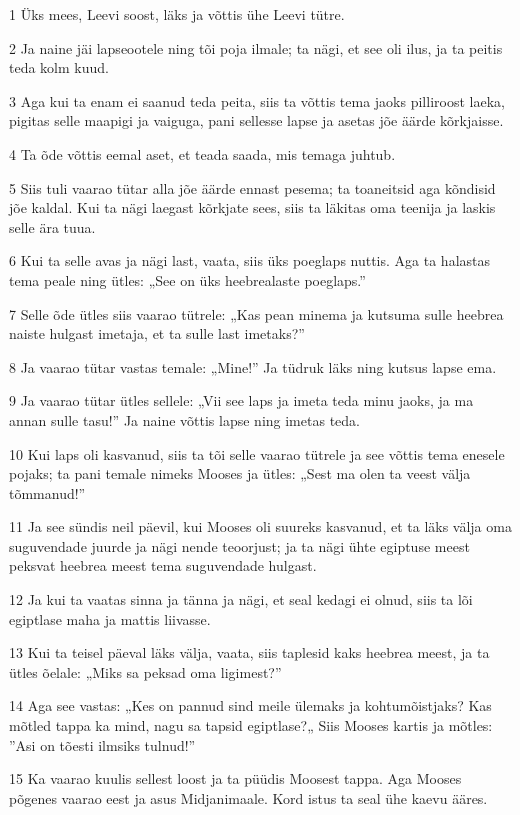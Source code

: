 \par 1 Üks mees, Leevi soost, läks ja võttis ühe Leevi tütre.
\par 2 Ja naine jäi lapseootele ning tõi poja ilmale; ta nägi, et see oli ilus, ja ta peitis teda kolm kuud.
\par 3 Aga kui ta enam ei saanud teda peita, siis ta võttis tema jaoks pilliroost laeka, pigitas selle maapigi ja vaiguga, pani sellesse lapse ja asetas jõe äärde kõrkjaisse.
\par 4 Ta õde võttis eemal aset, et teada saada, mis temaga juhtub.
\par 5 Siis tuli vaarao tütar alla jõe äärde ennast pesema; ta toaneitsid aga kõndisid jõe kaldal. Kui ta nägi laegast kõrkjate sees, siis ta läkitas oma teenija ja laskis selle ära tuua.
\par 6 Kui ta selle avas ja nägi last, vaata, siis üks poeglaps nuttis. Aga ta halastas tema peale ning ütles: „See on üks heebrealaste poeglaps.”
\par 7 Selle õde ütles siis vaarao tütrele: „Kas pean minema ja kutsuma sulle heebrea naiste hulgast imetaja, et ta sulle last imetaks?”
\par 8 Ja vaarao tütar vastas temale: „Mine!” Ja tüdruk läks ning kutsus lapse ema.
\par 9 Ja vaarao tütar ütles sellele: „Vii see laps ja imeta teda minu jaoks, ja ma annan sulle tasu!” Ja naine võttis lapse ning imetas teda.
\par 10 Kui laps oli kasvanud, siis ta tõi selle vaarao tütrele ja see võttis tema enesele pojaks; ta pani temale nimeks Mooses ja ütles: „Sest ma olen ta veest välja tõmmanud!”
\par 11 Ja see sündis neil päevil, kui Mooses oli suureks kasvanud, et ta läks välja oma suguvendade juurde ja nägi nende teoorjust; ja ta nägi ühte egiptuse meest peksvat heebrea meest tema suguvendade hulgast.
\par 12 Ja kui ta vaatas sinna ja tänna ja nägi, et seal kedagi ei olnud, siis ta lõi egiptlase maha ja mattis liivasse.
\par 13 Kui ta teisel päeval läks välja, vaata, siis taplesid kaks heebrea meest, ja ta ütles õelale: „Miks sa peksad oma ligimest?”
\par 14 Aga see vastas: „Kes on pannud sind meile ülemaks ja kohtumõistjaks? Kas mõtled tappa ka mind, nagu sa tapsid egiptlase?„ Siis Mooses kartis ja mõtles: ”Asi on tõesti ilmsiks tulnud!”
\par 15 Ka vaarao kuulis sellest loost ja ta püüdis Moosest tappa. Aga Mooses põgenes vaarao eest ja asus Midjanimaale. Kord istus ta seal ühe kaevu ääres.
